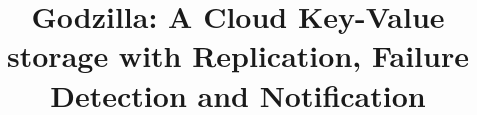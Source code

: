 \documentclass{sig-alternate}
\begin{document}
%
\title{Godzilla: A Cloud Key-Value storage with Replication, Failure Detection and Notification}%
%
%
%
%
%
\end{document}
